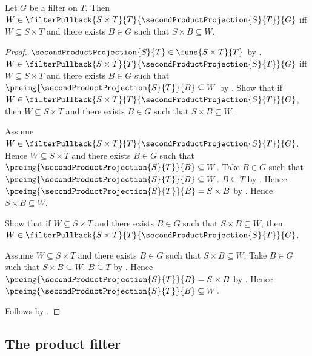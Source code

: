 \begin{theorem}\label{second_projection_filter_pullback_iff}
    Let $G$ be a filter on $T$.
    Then $W\in\filterPullback{S\times T}{T}{
        \secondProductProjection{S}{T}}{G}$ iff
        $W\subseteq S\times T$ and there exists $B\in G$ such that
        $S\times B\subseteq W$.
\end{theorem}
\begin{proof}
    $\secondProductProjection{S}{T}\in\funs{S\times T}{T}$ by
        .
    $W\in\filterPullback{S\times T}{T}{
        \secondProductProjection{S}{T}}{G}$ iff
        $W\subseteq S\times T$ and there exists $B\in G$ such that
        $\preimg{\secondProductProjection{S}{T}}{B}\subseteq W$ by
        .
    Show that if $W\in\filterPullback{S\times T}{T}{
        \secondProductProjection{S}{T}}{G}$, then
        $W\subseteq S\times T$ and there exists $B\in G$ such that
        $S\times B\subseteq W$.
    \begin{subproof}
        Assume $W\in\filterPullback{S\times T}{T}{
            \secondProductProjection{S}{T}}{G}$.
        Hence $W\subseteq S\times T$ and there exists $B\in G$ such that
            $\preimg{\secondProductProjection{S}{T}}{B}\subseteq W$.
        Take $B\in G$ such that
            $\preimg{\secondProductProjection{S}{T}}{B}\subseteq W$.
        $B\subseteq T$ by .
        Hence $\preimg{\secondProductProjection{S}{T}}{B}=S\times B$ by
            .
        Hence $S\times B\subseteq W$.
    \end{subproof}
    Show that if $W\subseteq S\times T$ and there exists $B\in G$ such
        that $S\times B\subseteq W$, then
        $W\in\filterPullback{S\times T}{T}{
            \secondProductProjection{S}{T}}{G}$.
    \begin{subproof}
        Assume $W\subseteq S\times T$ and there exists $B\in G$ such that
            $S\times B\subseteq W$.
        Take $B\in G$ such that $S\times B\subseteq W$.
        $B\subseteq T$ by .
        Hence $\preimg{\secondProductProjection{S}{T}}{B}=S\times B$ by
            .
        Hence $\preimg{\secondProductProjection{S}{T}}{B}\subseteq W$.
    \end{subproof}
    Follows by \auto.
\end{proof}

\subsection{The product filter}

